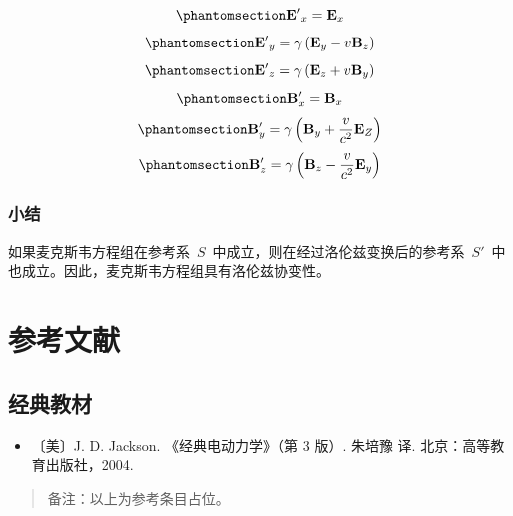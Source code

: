 \documentclass[
  chinese,
  a4paper,
  UTF8,
  12pt,
  oneside,
  openany]{ctexbook}
\providecommand{\tightlist}{%
  \setlength{\itemsep}{0pt}\setlength{\parskip}{0pt}}
\begin{document}
\begin{equation}\protect\phantomsection\label{eq-216255316}{
{\mathbf{E}'}_{x} = \mathbf{E}_{x}
}\end{equation}
\begin{equation}\protect\phantomsection\label{eq-216256709}{
{\mathbf{E}'}_{y} = \gamma\left( \mathbf{E}_{y} - v\mathbf{B}_{z} \right)
}\end{equation}
\begin{equation}\protect\phantomsection\label{eq-216257724}{
{\mathbf{E}'}_{z} = \gamma\left( \mathbf{E}_{z} + v\mathbf{B}_{y} \right)
}\end{equation}
\begin{equation}\protect\phantomsection\label{eq-216258492}{
\mathbf{B}_{x}' = \mathbf{B}_{x}
}\end{equation}
\begin{equation}\protect\phantomsection\label{eq-216258494}{
\mathbf{B}_{y}' = \gamma\left( \mathbf{B}_{y} + \frac{v}{c^{2}}\mathbf{E}_{Z} \right)
}\end{equation}
\begin{equation}\protect\phantomsection\label{eq-216258497}{
\mathbf{B}_{z}' = \gamma\left( \mathbf{B}_{z} - \frac{v}{c^{2}}\mathbf{E}_{y} \right)
}\end{equation}

\subsection{小结}\label{ux5c0fux7ed3}

如果麦克斯韦方程组在参考系~\(S\)~中成立，则在经过洛伦兹变换后的参考系~\(S'\)~中也成立。因此，麦克斯韦方程组具有洛伦兹协变性。

\newpage

\backmatter

\chapter*{参考文献}\label{references}

\protect{}\label{refs-classic}
\section{经典教材}\label{ux7ecfux5178ux6559ux6750}

\begin{itemize}
\tightlist
\item
  〔美〕J. D. Jackson. 《经典电动力学》（第 3 版）. 朱培豫 译.
  北京：高等教育出版社，2004.
\end{itemize}

\begin{quote}
备注：以上为参考条目占位。
\end{quote}


\backmatter
\end{document}
